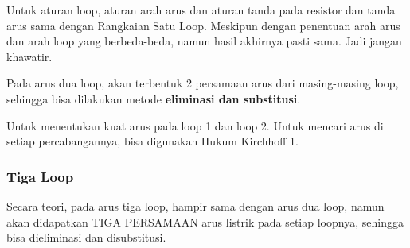 \documentclass[twocolumn, 11pt]{article}%
\begin{document}
    Untuk aturan loop, aturan arah arus dan aturan tanda pada resistor dan tanda arus sama dengan Rangkaian Satu Loop. Meskipun dengan penentuan arah arus dan arah loop yang berbeda-beda, namun hasil akhirnya pasti sama. Jadi jangan khawatir.

    Pada arus dua loop, akan terbentuk 2 persamaan arus dari masing-masing loop, sehingga bisa dilakukan metode \textbf{eliminasi dan substitusi}.
    
    Untuk menentukan kuat arus pada loop 1 dan loop 2. Untuk mencari arus di setiap percabangannya, bisa digunakan Hukum Kirchhoff 1.

    \subsubsection{Tiga Loop}%
    Secara teori, pada arus tiga loop, hampir sama dengan arus dua loop, namun akan didapatkan TIGA PERSAMAAN arus listrik pada setiap loopnya, sehingga bisa dieliminasi dan disubstitusi.
    
\end{document}
